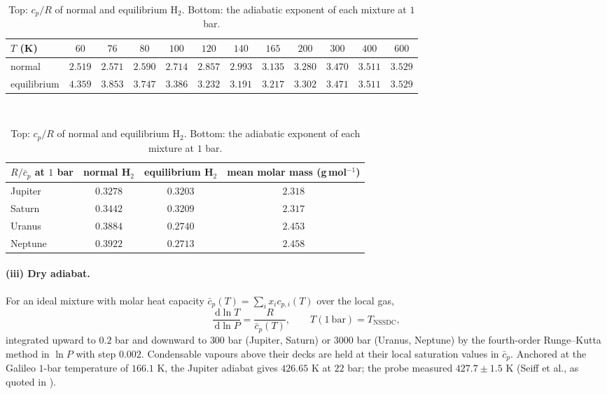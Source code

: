 \documentclass[11pt]{article}
\theoremstyle{definition}\newtheorem{definition}[theorem]{Definition}
\theoremstyle{remark}\newtheorem{remark}[theorem]{Remark}
\newcommand{\dd}{\,\mathrm d}\newcommand{\e}{\mathrm e}
\begin{document}
\begin{table}[!htb]\centering\footnotesize\setlength{\tabcolsep}{4pt}
\begin{tabular}{@{}lccccccccccc@{}}\toprule
$T$ (K) & $60$ & $76$ & $80$ & $100$ & $120$ & $140$ & $165$ & $200$ & $300$ & $400$ & $600$\\\midrule
normal & $2.519$ & $2.571$ & $2.590$ & $2.714$ & $2.857$ & $2.993$ & $3.135$ & $3.280$ & $3.470$ & $3.511$ & $3.529$\\
equilibrium & $4.359$ & $3.853$ & $3.747$ & $3.386$ & $3.232$ & $3.191$ & $3.217$ & $3.302$ & $3.471$ & $3.511$ & $3.529$\\\bottomrule
\end{tabular}
\\[4pt]
\begin{tabular}{@{}lccc@{}}\toprule
$R/\bar c_p$ at $1$ bar & normal H$_2$ & equilibrium H$_2$ & mean molar mass (g\,mol$^{-1}$)\\\midrule
Jupiter & $0.3278$ & $0.3203$ & $2.318$\\
Saturn & $0.3442$ & $0.3209$ & $2.317$\\
Uranus & $0.3884$ & $0.2740$ & $2.453$\\
Neptune & $0.3922$ & $0.2713$ & $2.458$\\\bottomrule
\end{tabular}
\caption{Top: $c_p/R$ of normal and equilibrium H$_2$. Bottom: the adiabatic exponent of each mixture at $1$ bar.}\label{tab:cp}
\end{table}

\paragraph{(iii) Dry adiabat.} For an ideal mixture with molar heat capacity $\bar c_p(T)=\sum_ix_ic_{p,i}(T)$ over the local gas,
\[
\frac{\dd\ln T}{\dd\ln P}=\frac R{\bar c_p(T)},\qquad T(1\ \mathrm{bar})=T_\mathrm{NSSDC},
\]
integrated upward to $0.2$ bar and downward to $300$ bar (Jupiter, Saturn) or $3000$ bar (Uranus, Neptune) by the fourth-order Runge--Kutta method in $\ln P$ with step $0.002$. Condensable vapours above their decks are held at their local saturation values in $\bar c_p$. Anchored at the Galileo $1$-bar temperature of $166.1$ K, the Jupiter adiabat gives $426.65$ K at $22$ bar; the probe measured $427.7\pm1.5$ K (Seiff et al., as quoted in \cite{Guillot2020b}).
\end{document}

